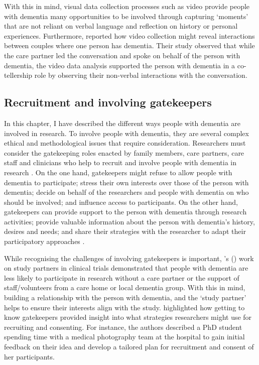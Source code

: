 With this in mind, visual data collection processes such as video provide people with dementia many opportunities to be involved through capturing `moments' that are not reliant on verbal language and reflection on history or personal experiences. Furthermore, \cite{majlesi2017video} reported how video collection might reveal interactions between couples where one person has dementia. Their study observed that while the care partner led the conversation and spoke on behalf of the person with dementia, the video data analysis supported the person with dementia in a co-tellership role by observing their non-verbal interactions with the conversation.

\subsection{Recruitment and involving gatekeepers}
\label{BL:EthicalDilemmas}
In this chapter, I have described the different ways people with dementia are involved in research. To involve people with dementia, they are several complex ethical and methodological issues that require consideration. Researchers must consider the gatekeeping roles enacted by family members, care partners, care staff and clinicians who help to recruit and involve people with dementia in research \citep{ries2020ethical}. On the one hand, gatekeepers might refuse to allow people with dementia to participate; stress their own interests over those of the person with dementia; decide on behalf of the researchers and people with dementia on who should be involved; and influence access to participants. On the other hand, gatekeepers can provide support to the person with dementia through research activities; provide valuable information about the person with dementia's history, desires and needs; and share their strategies with the researcher to adapt their participatory approaches \citep{novek2019safe}.

While recognising the challenges of involving gatekeepers is important, \citeauthor{grill2014facilitating}'s (\citeyear{grill2014facilitating}) work on study partners in clinical trials demonstrated that people with dementia are less likely to participate in research without a care partner or the support of staff/volunteers from a care home or local dementia group. With this in mind, building a relationship with the person with dementia, and the `study partner' helps to ensure their interests align with the study. \cite{bartlett2019strategies} highlighted how getting to know gatekeepers provided insight into what strategies researchers might use for recruiting and consenting. For instance, the authors described a PhD student spending time with a medical photography team at the hospital to gain initial feedback on their idea and develop a tailored plan for recruitment and consent of her participants. 

